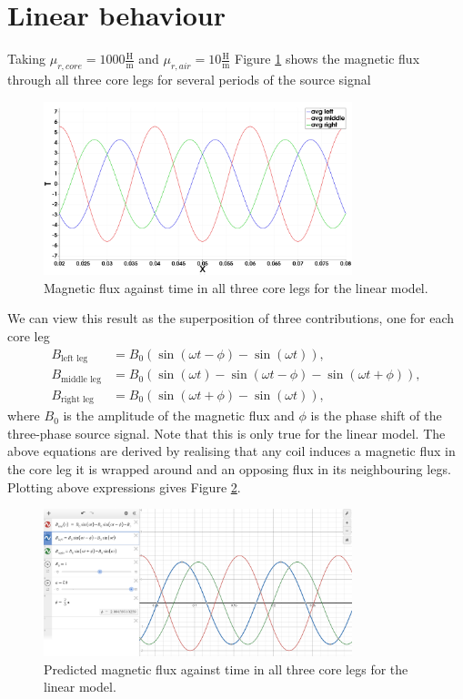 \section{Linear behaviour}
Taking $\mu_{r, core} = 1000 \frac{\text{H}}{\text{m}}$  and $\mu_{r, air} = 10 \frac{\text{H}}{\text{m}}$ 
Figure \ref{fig:linear_model} shows the magnetic flux through all three core legs for several periods of the source signal
\begin{figure}[H]
    \centering
    \includegraphics[width=0.8\textwidth]{img/B_phase_plot_linear_mu.png}
    \caption{Magnetic flux against time in all three core legs for the linear model.}
    \label{fig:linear_model}
\end{figure}
We can view this result as the superposition of three contributions, one for each core leg
\begin{align*}
    B_{\text{left leg}} &= B_0\left(\sin(\omega t - \phi) - \sin(\omega t)\right), \\
    B_{\text{middle leg}} &= B_0\left(\sin(\omega t) - \sin(\omega t - \phi) - \sin(\omega t + \phi)\right), \\
    B_{\text{right leg}} &= B_0\left(\sin(\omega t + \phi) - \sin(\omega t)\right),
\end{align*}
where $B_0$ is the amplitude of the magnetic flux and $\phi$ is the phase shift of the three-phase source signal.
Note that this is only true for the linear model. The above equations are derived by realising that any
coil induces a magnetic flux in the core leg it is wrapped around and an opposing flux in its neighbouring legs. Plotting above 
expressions gives Figure \ref{fig:linear_model_theory}.
\begin{figure}[H]
    \centering
    \includegraphics[width=0.8\textwidth]{img/Screenshot_68.png}
    \caption{Predicted magnetic flux against time in all three core legs for the linear model.}
    \label{fig:linear_model_theory}
\end{figure}


